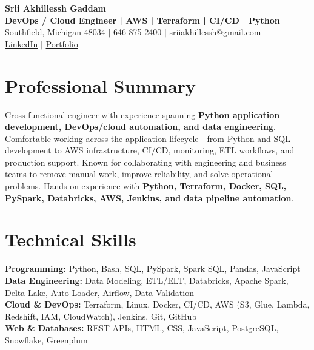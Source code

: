 \documentclass[letterpaper,10pt]{article}
\begin{document}
\fontsize{9.35pt}{10.45pt}\selectfont

\begin{center}
    {\LARGE \textbf{Srii Akhillessh Gaddam}} \\[-1pt]
    \textbf{DevOps / Cloud Engineer | AWS | Terraform | CI/CD | Python} \\[2pt]
    Southfield, Michigan 48034 $|$
    \href{tel:6468752400}{646-875-2400} $|$
    \href{mailto:sriiakhillessh@gmail.com}{sriiakhillessh@gmail.com} \\[1pt]
    \href{https://www.linkedin.com/in/srii-akhiilessh-gaddam-b48668191/}{LinkedIn} $|$
    \href{https://sriiakhillesshg.github.io/portfolio/}{Portfolio}
\end{center}
\vspace{-8pt}

\section{Professional Summary}
\small{Cross-functional engineer with experience spanning \textbf{Python application development, DevOps/cloud automation, and data engineering}. Comfortable working across the application lifecycle - from Python and SQL development to AWS infrastructure, CI/CD, monitoring, ETL workflows, and production support. Known for collaborating with engineering and business teams to remove manual work, improve reliability, and solve operational problems. Hands-on experience with \textbf{Python, Terraform, Docker, SQL, PySpark, Databricks, AWS, Jenkins, and data pipeline automation}.}

\section{Technical Skills}
\small{
\textbf{Programming:} Python, Bash, SQL, PySpark, Spark SQL, Pandas, JavaScript \\
\textbf{Data Engineering:} Data Modeling, ETL/ELT, Databricks, Apache Spark, Delta Lake, Auto Loader, Airflow, Data Validation \\
\textbf{Cloud \& DevOps:} Terraform, Linux, Docker, CI/CD, AWS (S3, Glue, Lambda, Redshift, IAM, CloudWatch), Jenkins, Git, GitHub \\
\textbf{Web \& Databases:} REST APIs, HTML, CSS, JavaScript, PostgreSQL, Snowflake, Greenplum
}
\end{document}
